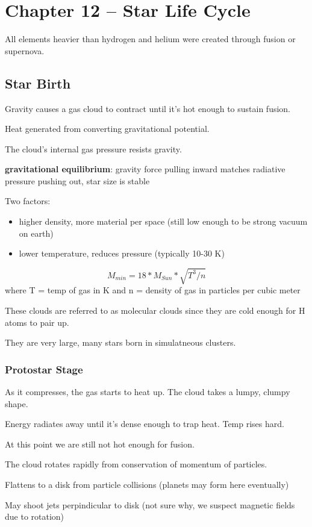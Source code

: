 \section{Chapter 12 -- Star Life Cycle}
All elements heavier than hydrogen and helium were created through fusion or supernova.

\subsection{Star Birth}
Gravity causes a gas cloud to contract until it's hot enough to sustain fusion.

Heat generated from converting gravitational potential.

The cloud's internal gas pressure resists gravity.

{\bf gravitational equilibrium}: gravity force pulling inward matches radiative pressure pushing out, star size is stable

Two factors:
\begin{itemize}
\item higher density, more material per space (still low enough to be strong vacuum on earth)
\item lower temperature, reduces pressure (typically 10-30 K)
\end{itemize}

\[ M_{min} = 18 * M_{Sun} * \sqrt{T^3 / n} \] where T = temp of gas in K and n = density of gas in particles per cubic meter

These clouds are referred to as molecular clouds since they are cold enough for H atoms to pair up.

They are very large, many stars born in simulatneous clusters.

\subsubsection{Protostar Stage}
As it compresses, the gas starts to heat up. The cloud takes a lumpy, clumpy shape.

Energy radiates away until it's dense enough to trap heat. Temp rises hard.

At this point we are still not hot enough for fusion.

The cloud rotates rapidly from conservation of momentum of particles.

Flattens to a disk from particle collisions (planets may form here eventually)

May shoot jets perpindicular to disk (not sure why, we suspect magnetic fields due to rotation)

